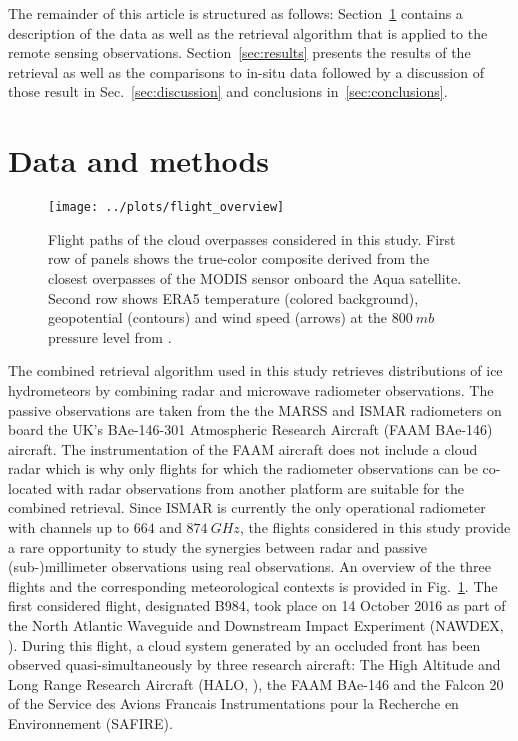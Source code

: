 \documentclass[journal abbreviation, manuscript]{copernicus}
\begin{document}
The remainder of this article is structured as follows:
Section~\ref{sec:methods_and_data} contains a description of the data as well as
the retrieval algorithm that is applied to the remote sensing observations.
Section~\ref{sec:results} presents the results of the retrieval as well as the
comparisons to in-situ data followed by a discussion of those result in
Sec.~\ref{sec:discussion} and conclusions in~\ref{sec:conclusions}.


\section{Data and methods}
\label{sec:methods_and_data}

\begin{figure}[h!]
  \centering \texttt{[image: ../plots/flight\_overview]}
  \caption{Flight paths of the cloud overpasses considered in this study. First
    row of panels shows the true-color composite derived from the closest
    overpasses of the MODIS \citep{modis} sensor onboard the Aqua satellite.
    Second row shows ERA5 temperature (colored background),
    geopotential (contours) and wind speed (arrows) at the $800\ \unit{mb}$
    pressure level from \citep{era5}.}
  \label{fig:flight_overview}
\end{figure}

The combined retrieval algorithm used in this study retrieves distributions of
ice hydrometeors by combining radar and microwave radiometer observations. The
passive observations are taken from the the MARSS \citep{mcgrath01} and ISMAR
\citep{fox17} radiometers on board the UK’s BAe-146-301 Atmospheric Research
Aircraft (FAAM BAe-146) aircraft. The instrumentation of the FAAM aircraft does
not include a cloud radar which is why only flights for which the radiometer
observations can be co-located with radar observations from another platform are
suitable for the combined retrieval. Since ISMAR is currently the only
operational radiometer with channels up to $664$ and $874\ \unit{GHz}$, the
flights considered in this study provide a rare opportunity to study the
synergies between radar and passive (sub-)millimeter observations using real
observations.
An overview of the three flights and the corresponding meteorological contexts
is provided in Fig.~\ref{fig:flight_overview}. The first considered flight,
designated B984, took place on 14 October 2016 as part of the North Atlantic
Waveguide and Downstream Impact Experiment (NAWDEX, \citet{schafler18}). During
this flight, a cloud system generated by an occluded front has been observed
quasi-simultaneously by three research aircraft: The High Altitude and Long
Range Research Aircraft (HALO, \citet{krautstrunk12}), the FAAM BAe-146 and the
Falcon 20 of the Service des Avions Francais Instrumentations pour la Recherche
en Environnement (SAFIRE).
\end{document}
